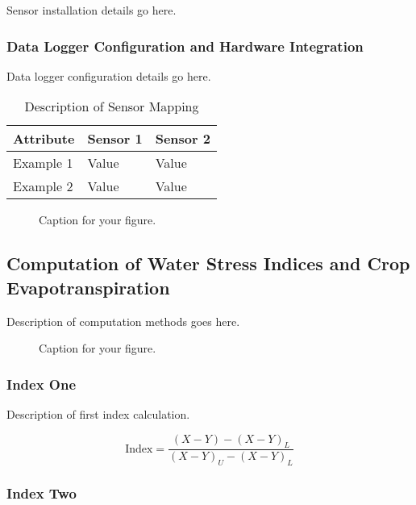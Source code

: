 \documentclass[12pt]{article}
\begin{document}
Sensor installation details go here.

\subsubsection{Data Logger Configuration and Hardware Integration}

Data logger configuration details go here.

\begin{table}[ht]
  \centering
  \caption{Description of Sensor Mapping}
  \label{tab:sensor-mapping}
  \begin{tabular}{|l|l|l|}
  \hline
  \textbf{Attribute} & \textbf{Sensor 1} & \textbf{Sensor 2} \\ \hline
  Example 1 & Value & Value \\ \hline
  Example 2 & Value & Value \\ \hline
  \end{tabular}
\end{table}

\begin{figure}[htbp]
    \centering
    \caption{Caption for your figure.}
    \label{fig:sensor-mapping}
\end{figure}

\subsection{Computation of Water Stress Indices and Crop Evapotranspiration}

Description of computation methods goes here.

\begin{figure}[htbp]
    \centering
    \caption{Caption for your figure.}
    \label{fig:cloud-functions}
\end{figure}

\subsubsection{Index One}

Description of first index calculation.

\begin{equation}
\text{Index} = \frac{(X - Y) - (X - Y)_L}{(X - Y)_U - (X - Y)_L}
\label{eq:index1}
\end{equation}

\subsubsection{Index Two}
\end{document}
